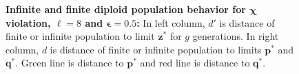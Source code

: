 \begin{figure}[!b]
\begin{center}
\hspace{-3em}%
\vspace{-0.5em}  \hspace{-3em}%


\caption[\textbf{Infinite and finite diploid population behavior for $\bm{\chi}$ violation, $\ell = 8$ and $\bm{\epsilon} = 0.5$}]
{\textbf{Infinite and finite diploid population behavior for $\bm{\chi}$ violation, $\ell = 8$ and $\bm{\epsilon} = 0.5$:} 
In left column, $d'$ is distance of finite or infinite population to limit $\bm{z}^\ast$ for $g$ generations. 
In right column, $d$ is distance of finite or infinite population to limits $\bm{p}^\ast$ and $\bm{q}^\ast$. Green line is distance to $\bm{p}^\ast$ and red line is distance to $\bm{q}^\ast$.}
\label{oscillation_8d_vio_chi_0.5}
\end{center}
\end{figure}

